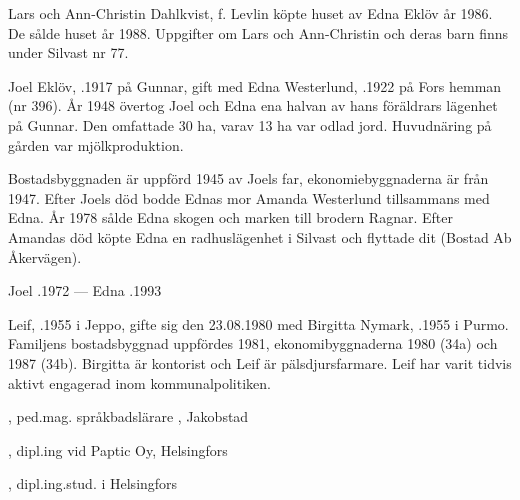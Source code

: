 %
Lars och Ann-Christin Dahlkvist, f. Levlin  köpte huset av Edna Eklöv år 1986. De sålde huset år 1988. Uppgifter om Lars och Ann-Christin och deras barn finns under Silvast nr 77.


%
Joel Eklöv, .1917 på Gunnar, gift med Edna Westerlund, .1922 på Fors hemman (nr 396). År 1948 övertog Joel och Edna ena halvan av hans föräldrars lägenhet på Gunnar. Den omfattade 30 ha, varav 13 ha var odlad jord. Huvudnäring på gården var mjölkproduktion.

Bostadsbyggnaden är uppförd 1945 av Joels far, ekonomiebyggnaderna är från 1947. Efter Joels död bodde Ednas mor Amanda Westerlund tillsammans med Edna. År 1978 sålde Edna skogen och marken till brodern Ragnar. Efter Amandas död köpte Edna en radhuslägenhet i Silvast och flyttade dit (Bostad Ab Åkervägen).

Joel .1972  ---  Edna .1993


%



%
Leif, .1955 i Jeppo, gifte sig den 23.08.1980 med Birgitta Nymark, .1955 i Purmo. Familjens bostadsbyggnad uppfördes 1981, ekonomibyggnaderna 1980 (34a) och 1987 (34b). Birgitta är kontorist och Leif är pälsdjursfarmare. Leif har varit tidvis aktivt engagerad inom kommunalpolitiken.
\begin{jhchildren}
  \item {}, ped.mag. språkbadslärare , Jakobstad
  \item {}, dipl.ing vid Paptic Oy, Helsingfors
  \item {}, dipl.ing.stud. i Helsingfors
\end{jhchildren}



%


